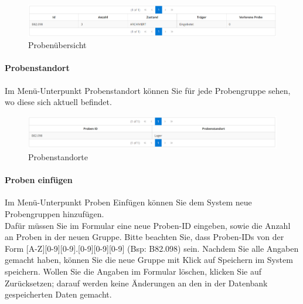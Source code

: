 \documentclass[enabledeprecatedfontcommands,fontsize=12pt,paper=a4,twoside]{scrartcl}
\begin{document}
\begin{figure}[h!]
\begin{center}
 \includegraphics[width=\textwidth]{screenshots/l/probenubersicht.png}
  \caption{Probenübersicht}
  \label{fig:boat1}
\end{center}
\end{figure}

\paragraph{Probenstandort}
Im Menü-Unterpunkt Probenstandort können Sie für jede Probengruppe sehen, wo diese sich aktuell befindet. \\

\begin{figure}[h!]
\begin{center}
 \includegraphics[width=\textwidth]{screenshots/l/probestandort.png}
  \caption{Probenstandorte}
  \label{fig:boat1}
\end{center}
\end{figure}

\paragraph{Proben einfügen}
Im Menü-Unterpunkt Proben Einfügen können Sie dem System neue Probengruppen hinzufügen. \\

Dafür müssen Sie im Formular eine neue Proben-ID eingeben, sowie die Anzahl an Proben in der neuen Gruppe. Bitte beachten Sie, dass Proben-IDs von der Form [A-Z][0-9][0-9].[0-9][0-9][0-9] (Bsp: B82.098) sein. Nachdem Sie alle Angaben gemacht haben, können Sie die neue Gruppe mit Klick auf Speichern im System speichern. Wollen Sie die Angaben im Formular löschen, klicken Sie auf Zurücksetzen; darauf werden keine Änderungen an den in der Datenbank gespeicherten Daten gemacht. \\
\end{document}
